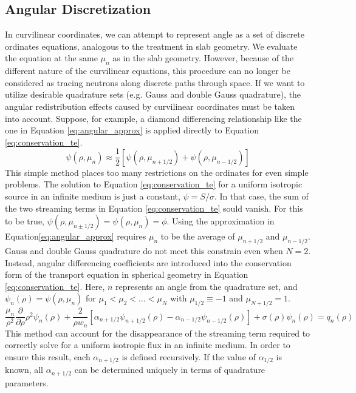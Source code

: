 \documentclass[11pt, oneside]{article}   	%
\begin{document}
\subsection{Angular Discretization}

In curvilinear coordinates, we can attempt to represent angle as a set of discrete ordinates equations, analogous to the treatment in slab geometry. We evaluate the equation at the same $\mu_n$ as in the slab geometry. However, because of the different nature of the curvilinear equations, this procedure can no longer be considered as tracing neutrons along discrete paths through space. If we want to utilize desirable quadrature sets (e.g. Gauss and double Gauss quadrature), the angular redistribution effects caused by curvilinear coordinates must be taken into account. Suppose, for example, a diamond differencing relationship like the one in Equation \ref{eq:angular_approx} is applied directly to Equation \ref{eq:conservation_te}.
%
\begin{equation}\label{eq:angular_approx}
\psi(\rho, \mu_n) \approx \frac{1}{2}\left[\psi(\rho, \mu_{n+1/2})+\psi(\rho, \mu_{n-1/2})\right]
\end{equation}
%
This simple method places too many restrictions on the ordinates for even simple problems. The solution to Equation \ref{eq:conservation_te} for a uniform isotropic source in an infinite medium is just a constant, $\psi = S/\sigma$. In that case, the sum of the two streaming terms in Equation \ref{eq:conservation_te} sould vanish. For this to be true, $\psi(\rho, \mu_{n\pm1/2})=\psi(\rho, \mu_n)=\phi$. Using the approximation in Equation\ref{eq:angular_approx} requires $\mu_n$ to be the average of $\mu_{n+1/2}$ and $\mu_{n-1/2}$. Gauss and double Gauss quadrature do not meet this constrain even when $N=2$. Instead, angular differencing coefficients are introduced into the conservation form of the transport equation in spherical geometry in Equation \ref{eq:conservation_te}. Here, $n$ represents an angle from the quadrature set, and $\psi_n(\rho) = \psi(\rho, \mu_n)$ for $\mu_1 < \mu_2 < \dots < \mu_N$ with $\mu_{1/2} \equiv -1$ and $\mu_{N+1/2} = 1$.
%
\begin{equation}\label{eq:conservation_te_angular_difference}
\frac{\mu_n}{\rho^2}\frac{\partial}{\partial\rho}\rho^2\psi_n(\rho)+
\frac{2}{\rho w_n}\left[\alpha_{n+1/2}\psi_{n+1/2}(\rho)-\alpha_{n-1/2}\psi_{n-1/2}(\rho)\right]+
\sigma(\rho)\psi_n(\rho) = 
q_n(\rho)
\end{equation}
%
This method can account for the disappearance of the streaming term required to correctly solve for a uniform isotropic flux in an infinite medium. In order to ensure this result, each $\alpha_{n+1/2}$ is defined recursively. If the value of $\alpha_{1/2}$ is known, all  $\alpha_{n+1/2}$ can be determined uniquely in terms of quadrature parameters.
\end{document}

